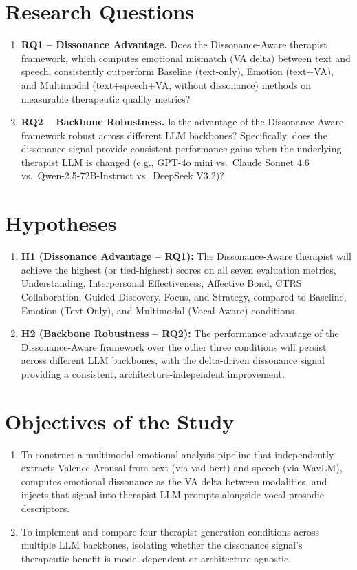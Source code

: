 \section{Research Questions}
\begin{enumerate}
    \item \textbf{RQ1 -- Dissonance Advantage.} Does the Dissonance-Aware therapist framework, which computes emotional mismatch (VA delta) between text and speech, consistently outperform Baseline (text-only), Emotion (text+VA), and Multimodal (text+speech+VA, without dissonance) methods on measurable therapeutic quality metrics?

    \item \textbf{RQ2 -- Backbone Robustness.} Is the advantage of the Dissonance-Aware framework robust across different LLM backbones? Specifically, does the dissonance signal provide consistent performance gains when the underlying therapist LLM is changed (e.g., GPT-4o mini vs.\ Claude Sonnet 4.6 vs.\ Qwen-2.5-72B-Instruct vs.\ DeepSeek V3.2)?
\end{enumerate}

\section{Hypotheses}

\begin{enumerate}
    \item \textbf{H1 (Dissonance Advantage -- RQ1):} The Dissonance-Aware therapist will achieve the highest (or tied-highest) scores on all seven evaluation metrics, Understanding, Interpersonal Effectiveness, Affective Bond, CTRS Collaboration, Guided Discovery, Focus, and Strategy, compared to Baseline, Emotion (Text-Only), and Multimodal (Vocal-Aware) conditions.

    \item \textbf{H2 (Backbone Robustness -- RQ2):} The performance advantage of the Dissonance-Aware framework over the other three conditions will persist across different LLM backbones, with the delta-driven dissonance signal providing a consistent, architecture-independent improvement.
\end{enumerate}

\section{Objectives of the Study}

\begin{enumerate}
    \item To construct a multimodal emotional analysis pipeline that independently extracts Valence-Arousal from text (via vad-bert) and speech (via WavLM), computes emotional dissonance as the VA delta between modalities, and injects that signal into therapist LLM prompts alongside vocal prosodic descriptors.

    \item To implement and compare four therapist generation conditions across multiple LLM backbones, isolating whether the dissonance signal's therapeutic benefit is model-dependent or architecture-agnostic.
\end{enumerate}


